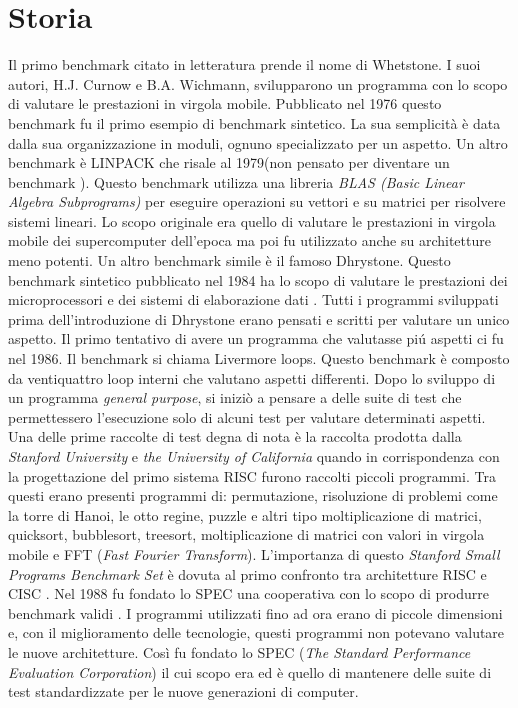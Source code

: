 \documentclass[12pt, a4paper]{report}
\begin{document}
\section{Storia}
Il primo benchmark citato in letteratura prende il nome di Whetstone. I suoi autori, H.J. Curnow e B.A. Wichmann, svilupparono un programma con lo scopo di valutare le prestazioni in virgola mobile. Pubblicato nel 1976 questo benchmark fu il primo esempio di benchmark sintetico. La sua semplicità è data dalla sua organizzazione in moduli, ognuno specializzato per un aspetto.
 Un altro benchmark è LINPACK che risale al 1979(non pensato per diventare un benchmark ). Questo benchmark utilizza una libreria \textit{BLAS (Basic Linear Algebra Subprograms) } per eseguire operazioni su vettori e su matrici per risolvere sistemi lineari. Lo scopo originale era quello di valutare le prestazioni in virgola mobile dei supercomputer dell'epoca ma poi fu utilizzato anche su architetture meno potenti\cite{LinpackSite}.
 Un altro benchmark simile è il famoso Dhrystone. Questo benchmark sintetico pubblicato nel 1984 ha lo scopo di valutare le prestazioni dei microprocessori e dei sistemi di elaborazione dati \cite{DhrystoneWP}.
 Tutti i programmi sviluppati prima dell'introduzione di Dhrystone erano pensati e scritti per valutare un unico aspetto. Il primo tentativo di avere un programma che valutasse pi\'u aspetti ci fu nel 1986. Il benchmark si chiama Livermore loops. Questo benchmark è composto da ventiquattro loop interni che valutano aspetti differenti. 
 Dopo lo sviluppo di un programma \textit{general purpose}, si iniziò a pensare a delle suite di test che permettessero l'esecuzione solo di alcuni test per valutare determinati aspetti.
Una delle prime raccolte di test degna di nota è la raccolta prodotta dalla \textit{Stanford University} e \textit{the University of California} quando in corrispondenza con la progettazione del primo sistema RISC furono raccolti piccoli programmi. Tra questi erano presenti programmi di: permutazione,  risoluzione di problemi come la torre di Hanoi, le otto regine,  puzzle e altri tipo moltiplicazione di matrici, quicksort, bubblesort, treesort, moltiplicazione di matrici con valori in virgola mobile e FFT (\textit{Fast Fourier Transform}).  L'importanza di questo \textit{Stanford Small Programs Benchmark Set} è dovuta al primo confronto tra architetture RISC e CISC \cite{CommonBench}.
 Nel 1988 fu fondato lo SPEC una cooperativa con lo scopo di produrre benchmark validi \cite{SPECSite}.%
 I programmi utilizzati fino ad ora erano di piccole dimensioni e, con il miglioramento delle tecnologie, questi programmi non potevano valutare le nuove architetture. Così fu fondato lo SPEC (\textit{The Standard Performance Evaluation Corporation}) il cui scopo era ed è quello di mantenere delle suite di test standardizzate per le nuove generazioni di computer. 
\end{document}
